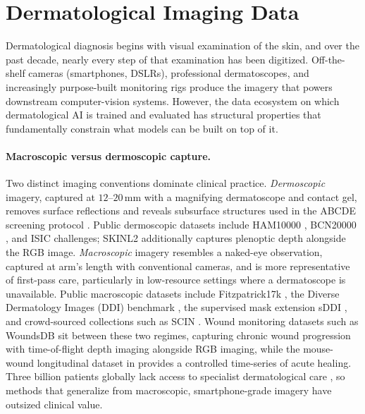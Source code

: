 \documentclass[11pt]{ucthesis}
\begin{document}
\section{Dermatological Imaging Data}
\label{sec:bg_data}

Dermatological diagnosis begins with visual examination of the skin, and over the past decade, nearly every step of that examination has been digitized. Off-the-shelf cameras (smartphones, DSLRs), professional dermatoscopes, and increasingly purpose-built monitoring rigs \cite{Li2023ProgrammableDO,carrion2021automatic} produce the imagery that powers downstream computer-vision systems. However, the data ecosystem on which dermatological AI is trained and evaluated has structural properties that fundamentally constrain what models can be built on top of it.

\paragraph{Macroscopic versus dermoscopic capture.}
Two distinct imaging conventions dominate clinical practice. \emph{Dermoscopic} imagery, captured at $12$--$20$\,mm with a magnifying dermatoscope and contact gel, removes surface reflections and reveals subsurface structures used in the ABCDE screening protocol \cite{argenziano-1998,blum-2003}. Public dermoscopic datasets include HAM10000 \cite{tschandl_2018_the}, BCN20000 \cite{bcn}, and ISIC challenges; SKINL2 \cite{de-faria-2019} additionally captures plenoptic depth alongside the RGB image. \emph{Macroscopic} imagery resembles a naked-eye observation, captured at arm's length with conventional cameras, and is more representative of first-pass care, particularly in low-resource settings where a dermatoscope is unavailable. Public macroscopic datasets include Fitzpatrick17k \cite{groh_2021_evaluating}, the Diverse Dermatology Images (DDI) benchmark \cite{daneshjou_2022_disparities}, the supervised mask extension sDDI \cite{carrion-2023}, and crowd-sourced collections such as SCIN \cite{Jeong6186}. Wound monitoring datasets such as WoundsDB \cite{juszczyk-2020} sit between these two regimes, capturing chronic wound progression with time-of-flight depth imaging alongside RGB imaging, while the mouse-wound longitudinal dataset in \cite{carrion2021automatic} provides a controlled time-series of acute healing. Three billion patients globally lack access to specialist dermatological care \cite{coustasse_2019_use}, so methods that generalize from macroscopic, smartphone-grade imagery have outsized clinical value.
\end{document}
